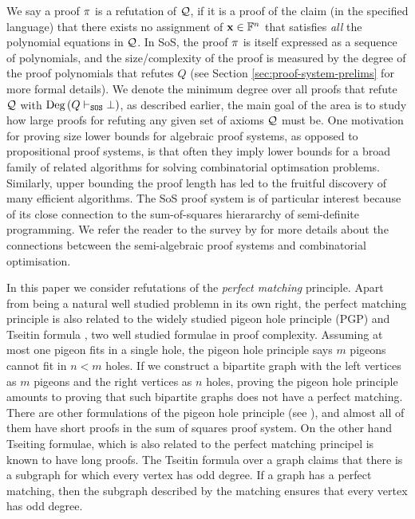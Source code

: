 \documentclass[11pt]{article}
\begin{document}
We say a proof $\pi$ is a refutation of $\mathcal{Q}$, if it is a proof of the claim (in the specified language) that there exists no assignment of $\mathbf{x} \in \mathbb{F}^n$ that satisfies \emph{all} the polynomial equations in $\mathcal{Q}$.
In SoS, the proof $\pi$ is itself expressed as a sequence of polynomials, and the size/complexity of the proof is measured by the degree of the proof polynomials that refutes $Q$ (see Section \ref{sec:proof-system-prelims} for more formal details).
We denote the minimum degree over all proofs that refute $\mathcal{Q}$ with $\text{Deg}\left(Q \vdash_{\texttt{SOS}} \bot\right)$, as described earlier, the main goal of the area is to study how large proofs for refuting any given set of axioms $\mathcal{Q}$ must be.
One motivation for proving size lower bounds for algebraic proof systems, as opposed to propositional proof systems, is that often they imply lower bounds for a broad family of related algorithms for solving combinatorial optimsation problems.
Similarly, upper bounding the proof length has led to the fruitful discovery of many efficient algorithms.
The SoS proof system is of particular interest because of its close connection to the sum-of-squares hierararchy of semi-definite programming.
We refer the reader to the survey by \citet{fleming2019semialgebraic} for more details about the connections betcween the semi-algebraic proof systems and combinatorial optimisation.\par
In this paper we consider refutations of the \emph{perfect matching} principle.
Apart from being a natural well studied problemn in its own right, the perfect matching principle is also related to the widely studied pigeon hole principle (PGP) \citep{razbarov2002pgp} and Tseitin formula \citep{grigoriev2001linear}, two well studied formulae in proof complexity.
Assuming at most one pigeon fits in a single hole, the pigeon hole principle says $m$ pigeons cannot fit in $n < m$ holes.
If we construct a bipartite graph with the left vertices as $m$ pigeons and the right vertices as $n$ holes, proving the pigeon hole principle amounts to proving that such bipartite graphs does not have a perfect matching.
There are other formulations of the pigeon hole principle (see \citep{razbarov2002pgp}), and almost all of them have short proofs in the sum of squares proof system.
On the other hand Tseiting formulae, which is also related to the perfect matching principel is known to have long proofs.
The Tseitin formula over a graph claims that there is a subgraph for which every vertex has odd degree.
If a graph has a perfect matching, then the subgraph described by the matching ensures that every vertex has odd degree.
\end{document}
